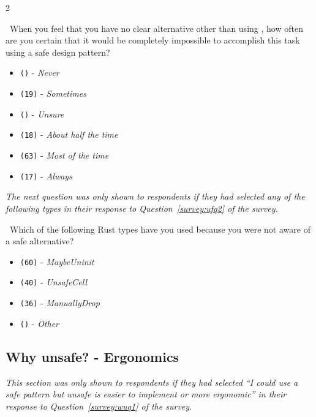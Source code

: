\begin{protocol}
\begin{multicols}{2}
\begin{itemize}
\end{itemize}
\end{multicols}
\item \label{survey:wunq2}   \ When you feel that you have no clear alternative other than using \unsafe, how often are you certain that it would be completely impossible to accomplish this task using a safe design pattern?
\begin{itemize}
\item \texttt{()} - \textit{Never}
\item \texttt{(19)} - \textit{Sometimes}
\item \texttt{()} - \textit{Unsure}
\item \texttt{(18)} - \textit{About half the time}
\item \texttt{(63)} - \textit{Most of the time}
\item \texttt{(17)} - \textit{Always}
\end{itemize}
\end{protocol}

\noindent \textit{The next question was only shown to respondents if they had selected any of the following types in their response to Question~\ref{survey:ufq2} of the survey.}
\begin{protocol}
\setcounter{protocoli}{2}
\item \label{survey:wunq3}   \ Which of the following Rust types have you used because you were not aware of a safe alternative?
\begin{itemize}
\item \texttt{(60)} - \textit{MaybeUninit}
\item \texttt{(40)} - \textit{UnsafeCell}
\item \texttt{(36)} - \textit{ManuallyDrop}
\item \texttt{()} - \textit{Other}
\end{itemize}
\end{protocol}

\subsection{Why unsafe? - Ergonomics}
\label{survey:sec:wueq}
\textit{This section was only shown to respondents if they had selected ``\textit{I could use a safe pattern but unsafe is easier to implement or more ergonomic}'' in their response to Question~\ref{survey:wuq1} of the survey.}

